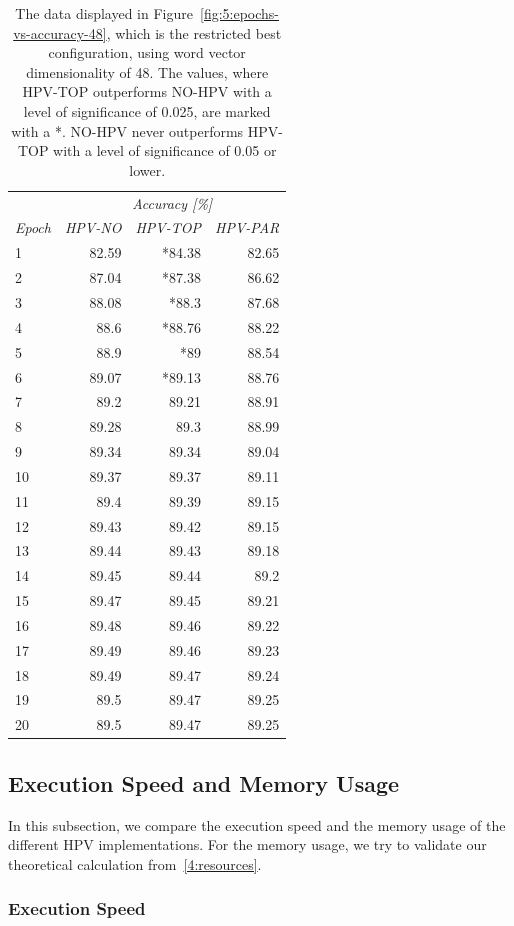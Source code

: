 \begin{table}
	\centering
	\caption{The data displayed in Figure~\ref{fig:5:epochs-vs-accuracy-48}, which is the restricted best configuration, using word vector dimensionality of 48. The values, where HPV-TOP outperforms NO-HPV with a level of significance of 0.025, are marked with a *. NO-HPV never outperforms HPV-TOP with a level of significance of 0.05 or lower.}
	\label{tab:5:epochs-vs-accuracy-48}
	\begin{tabular}{lrrr}
		\toprule
		& \multicolumn{3}{c}{\emph{Accuracy [\%]}}\tabularnewline
		\emph{Epoch}& \emph{HPV-NO}& \emph{HPV-TOP}& \emph{HPV-PAR}\tabularnewline
		\midrule
		1& 82.59& *84.38& 82.65\tabularnewline
		2& 87.04& *87.38& 86.62\tabularnewline
		3& 88.08& *88.3& 87.68\tabularnewline
		4& 88.6& *88.76& 88.22\tabularnewline
		5& 88.9& *89& 88.54\tabularnewline
		6& 89.07& *89.13& 88.76\tabularnewline
		7& 89.2& 89.21& 88.91\tabularnewline
		8& 89.28& 89.3& 88.99\tabularnewline
		9& 89.34& 89.34& 89.04\tabularnewline
		10& 89.37& 89.37& 89.11\tabularnewline
		11& 89.4& 89.39& 89.15\tabularnewline
		12& 89.43& 89.42& 89.15\tabularnewline
		13& 89.44& 89.43& 89.18\tabularnewline
		14& 89.45& 89.44& 89.2\tabularnewline
		15& 89.47& 89.45& 89.21\tabularnewline
		16& 89.48& 89.46& 89.22\tabularnewline
		17& 89.49& 89.46& 89.23\tabularnewline
		18& 89.49& 89.47& 89.24\tabularnewline
		19& 89.5& 89.47& 89.25\tabularnewline
		20& 89.5& 89.47& 89.25\tabularnewline
		\bottomrule
	\end{tabular}
\end{table}

\subsection{Execution Speed and Memory Usage}\label{5:execution-speed-and-memory-usage}

In this subsection, we compare the execution speed and the memory usage of the different HPV implementations. For the memory usage, we try to validate our theoretical calculation from~\ref{4:resources}.

\subsubsection{Execution Speed}


